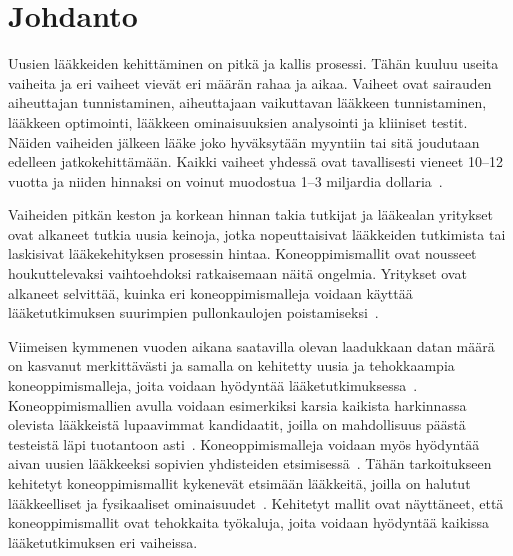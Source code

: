 \documentclass[finnish,twoside,censored,tkt,sw-line]{HYthesisML}
\begin{document}
\newpage
\mytableofcontents{}
\mainmatter{}


%
%
%
% 


\chapter{Johdanto}

Uusien lääkkeiden kehittäminen on pitkä ja kallis prosessi.
Tähän kuuluu useita vaiheita ja eri vaiheet vievät eri määrän rahaa ja aikaa.
Vaiheet ovat sairauden aiheuttajan tunnistaminen, aiheuttajaan vaikuttavan lääkkeen tunnistaminen, lääkkeen optimointi, lääkkeen ominaisuuksien analysointi ja kliiniset testit.
Näiden vaiheiden jälkeen lääke joko hyväksytään myyntiin tai sitä joudutaan edelleen jatkokehittämään.
Kaikki vaiheet yhdessä ovat tavallisesti vieneet 10--12 vuotta ja niiden hinnaksi on voinut muodostua 1--3 miljardia dollaria~\cite{EkinsSean2019Emlf}.

Vaiheiden pitkän keston ja korkean hinnan takia tutkijat ja lääkealan yritykset ovat alkaneet tutkia uusia keinoja, jotka nopeuttaisivat lääkkeiden tutkimista tai laskisivat lääkekehityksen prosessin hintaa.
Koneoppimismallit ovat nousseet houkuttelevaksi vaihtoehdoksi ratkaisemaan näitä ongelmia.
Yritykset ovat alkaneet selvittää, kuinka eri koneoppimismalleja voidaan käyttää lääketutkimuksen suurimpien pullonkaulojen poistamiseksi~\cite{EkinsSean2019Emlf}.

Viimeisen kymmenen vuoden aikana saatavilla olevan laadukkaan datan määrä on kasvanut merkittävästi ja samalla on kehitetty uusia ja tehokkaampia koneoppimismalleja, joita voidaan hyödyntää lääketutkimuksessa~\cite{ButlerKeithT2018Mlfm,VamathevanJessica2019Aoml}.
Koneoppimismallien avulla voidaan esimerkiksi karsia kaikista harkinnassa olevista lääkkeistä lupaavimmat kandidaatit, joilla on mahdollisuus päästä testeistä läpi tuotantoon asti~\cite{GayvertKaitlyn}.
Koneoppimismalleja voidaan myös hyödyntää aivan uusien lääkkeeksi sopivien yhdisteiden etsimisessä~\cite{ShinBonggun,ShaharHarelAndKiraRadinsky}.
Tähän tarkoitukseen kehitetyt koneoppimismallit kykenevät etsimään lääkkeitä, joilla on halutut lääkkeelliset ja fysikaaliset ominaisuudet~\cite{VamathevanJessica2019Aoml}.
Kehitetyt mallit ovat näyttäneet, että koneoppimismallit ovat tehokkaita työkaluja, joita voidaan hyödyntää kaikissa lääketutkimuksen eri vaiheissa.
\end{document}
